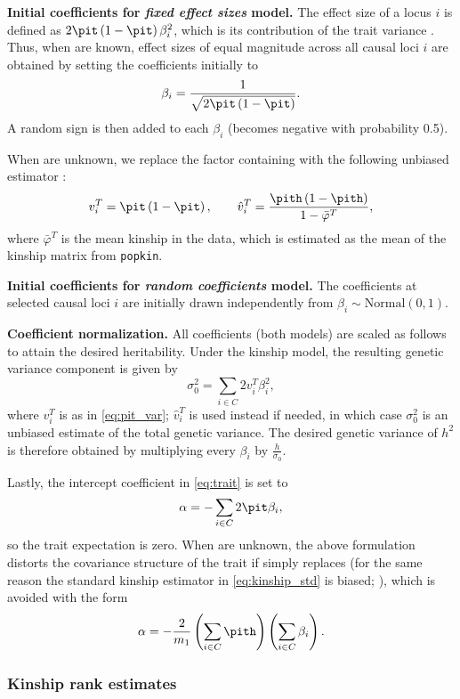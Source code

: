 \documentclass[11pt]{article}
\begin{document}
\textbf{Initial coefficients for \textit{fixed effect sizes} model.}
The effect size of a locus $i$ is defined as $2 \pit \left( 1 - \pit \right) \beta_i^2$, which is its contribution of the trait variance \citep{park_estimation_2010}.
Thus, when \pit are known, effect sizes of equal magnitude across all causal loci $i$ are obtained by setting the coefficients initially to
$$
\beta_i = \frac{1}{ \sqrt{ 2 \pit \left( 1 - \pit \right) } }.
$$
A random sign is then added to each $\beta_i$ (becomes negative with probability 0.5).

When \pit are unknown, we replace the factor containing \pit with the following unbiased estimator \citep{ochoa_estimating_2021}:
\begin{equation}
  \label{eq:pit_var}
  v_i^T = \pit \left( 1 - \pit \right),
  \quad\quad
  \hat{v}_i^T
  =
  \frac{ \pith \left( 1 - \pith \right) }{ 1 - \bar{\varphi}^T } 
  ,
\end{equation}
where $\bar{\varphi}^T$ is the mean kinship in the data, which is estimated as the mean of the kinship matrix from \texttt{popkin}.

\textbf{Initial coefficients for \textit{random coefficients} model.}
The coefficients at selected causal loci $i$ are initially drawn independently from $\beta_i \sim \text{Normal}( 0, 1 )$.

\textbf{Coefficient normalization.}
All coefficients (both models) are scaled as follows to attain the desired heritability.
Under the kinship model, the resulting genetic variance component is given by
$$
\sigma^2_0
=
\sum_{i \in C} 2 v_i^T \beta_i^2 ,
$$
where $v_i^T$ is as in \cref{eq:pit_var}; $\hat{v}_i^T$ is used instead if needed, in which case $\sigma^2_0$ is an unbiased estimate of the total genetic variance.
The desired genetic variance of $h^2$ is therefore obtained by multiplying every $\beta_i$ by $\frac{h}{ \sigma_0 }$.

Lastly, the intercept coefficient in \cref{eq:trait} is set to
$$
\alpha = - \sum_{i \in C} 2 \pit \beta_i,
$$
so the trait expectation is zero.
When \pit are unknown, the above formulation distorts the covariance structure of the trait if \pith simply replaces \pit (for the same reason the standard kinship estimator in \cref{eq:kinship_std} is biased; \cite{ochoa_estimating_2021}), which is avoided with the form
$$
\alpha = - \frac{2}{m_1} \left( \sum_{i \in C} \pith \right) \left(\sum_{i \in C} \beta_i \right).
$$

\subsubsection{Kinship rank estimates}
\end{document}
